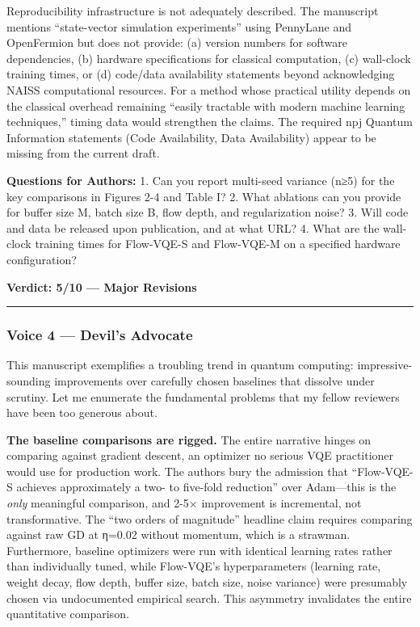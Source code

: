 \documentclass[10pt,letterpaper]{article}
\begin{document}
Reproducibility infrastructure is not adequately described. The manuscript mentions ``state-vector simulation experiments'' using PennyLane and OpenFermion but does not provide: (a) version numbers for software dependencies, (b) hardware specifications for classical computation, (c) wall-clock training times, or (d) code/data availability statements beyond acknowledging NAISS computational resources. For a method whose practical utility depends on the classical overhead remaining ``easily tractable with modern machine learning techniques,'' timing data would strengthen the claims. The required npj Quantum Information statements (Code Availability, Data Availability) appear to be missing from the current draft.

\textbf{Questions for Authors:}
1. Can you report multi-seed variance (n≥5) for the key comparisons in Figures 2-4 and Table I?
2. What ablations can you provide for buffer size M, batch size B, flow depth, and regularization noise?
3. Will code and data be released upon publication, and at what URL?
4. What are the wall-clock training times for Flow-VQE-S and Flow-VQE-M on a specified hardware configuration?

\textbf{Verdict: 5/10 --- Major Revisions}

\begin{center}\rule{0.5\linewidth}{0.5pt}\end{center}

\hypertarget{voice-4-devils-advocate}{%
\subsubsection{Voice 4 --- Devil's Advocate}\label{voice-4-devils-advocate}}

This manuscript exemplifies a troubling trend in quantum computing: impressive-sounding improvements over carefully chosen baselines that dissolve under scrutiny. Let me enumerate the fundamental problems that my fellow reviewers have been too generous about.

\textbf{The baseline comparisons are rigged.} The entire narrative hinges on comparing against gradient descent, an optimizer no serious VQE practitioner would use for production work. The authors bury the admission that ``Flow-VQE-S achieves approximately a two- to five-fold reduction'' over Adam---this is the \emph{only} meaningful comparison, and 2-5× improvement is incremental, not transformative. The ``two orders of magnitude'' headline claim requires comparing against raw GD at η=0.02 without momentum, which is a strawman. Furthermore, baseline optimizers were run with identical learning rates rather than individually tuned, while Flow-VQE's hyperparameters (learning rate, weight decay, flow depth, buffer size, batch size, noise variance) were presumably chosen via undocumented empirical search. This asymmetry invalidates the entire quantitative comparison.
\end{document}
